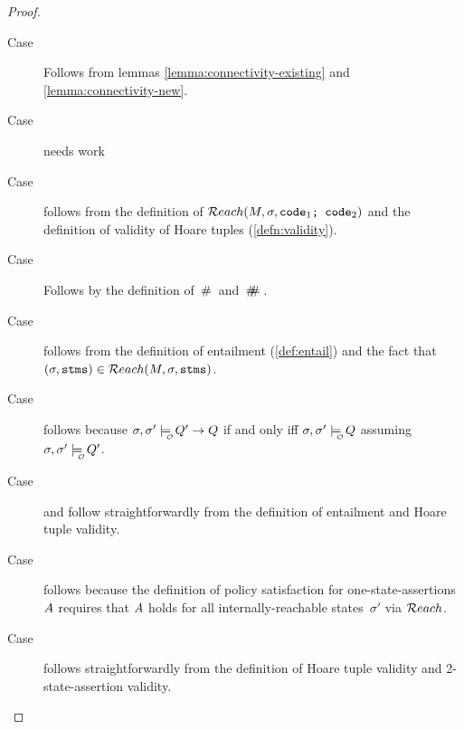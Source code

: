 \begin{proof}
\begin{description}
\item[Case] 
{Follows from lemmas \ref{lemma:connectivity-existing} and \ref{lemma:connectivity-new}.}

\item[Case] 
{needs work} 
\item[Case]  follows from the definition of \linebreak
${\mathcal{R}each}(M,\sigma,{\textrm{\ttfamily{code$_1$; code$_2$}}})$ and the definition of validity of
Hoare tuples (\autoref{defn:validity}).
\item[Case] 
Follows by the definition of $\,\#\,$ and $\,\#\!\!\!\#\,$.
\item[Case]  follows from the definition of entailment
(\autoref{def:entail}) and the fact that\\ $(\sigma,{\textrm{\ttfamily{stms}}}) \in {\mathcal{R}each}(M,\sigma,{\textrm{\ttfamily{stms}}})$.
\item[Case]  follows because $\sigma,\sigma' \modelsWithO   Q' \rightarrow Q$ if and only iff $\sigma,\sigma' \modelsWithO   Q$ assuming $\sigma,\sigma' \modelsWithO   Q'$.
\item[Case]  and  follow straightforwardly from
the definition of entailment and Hoare tuple validity.
\item[Case]  follows because the definition of policy
satisfaction for one-state-assertions~$A$ requires that $A$ holds for all
internally-reachable states~$\sigma'$ via ${\mathcal{R}each}$.
\item[Case]  follows straightforwardly from the
definition of Hoare tuple validity and 2-state-assertion validity.
\end{description}
  \end{proof}










